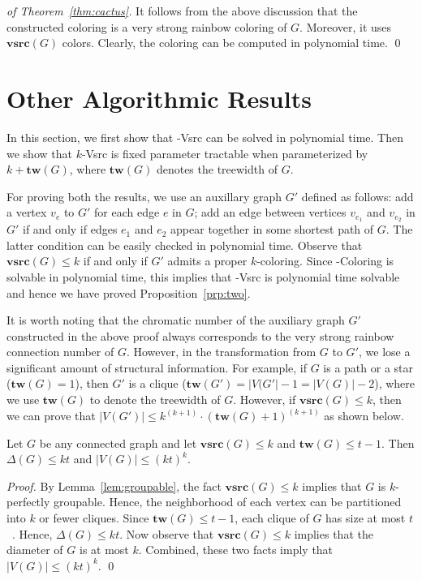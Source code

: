 \documentclass[letter,runningheads,envcountsame,envcountsect]{llncs}
\newcommand{\vsrc}{\mathbf{vsrc}}
\newcommand{\tw}{\mathbf{tw}}
\newcommand{\twovsrc}{{\sc 2-Vsrc}}
\newcommand{\kvsrc}{{\sc $k$-Vsrc}}
\newcommand{\twocolor}{{\sc 2-Coloring}}
\begin{document}
\begin{proof}[of Theorem~\ref{thm:cactus}]
It follows from the above discussion that the constructed coloring is a very strong rainbow coloring of $G$. Moreover, it uses $\vsrc(G)$ colors. Clearly, the coloring can be computed in polynomial time.
\qed\end{proof}


\section{Other Algorithmic Results}
\label{sec:other_results}
In this section, we first show that {\twovsrc} can be solved in polynomial time. Then we show that {\kvsrc} is fixed parameter tractable when parameterized by $k+\tw(G)$, where $\tw(G)$ denotes the treewidth of $G$. 

For proving both the results, we use an auxillary graph $G'$ defined as follows: add a vertex $v_e$ to $G'$ for each edge $e$ in $G$; add an edge between vertices $v_{e_1}$ and $v_{e_2}$ in $G'$ if and only if edges $e_1$ and $e_2$ appear together in some shortest path of $G$. The latter condition can be easily checked in polynomial time. 
Observe that $\vsrc(G) \leq k$ if and only if $G'$ admits a proper $k$-coloring.
Since {\twocolor} is solvable in polynomial time, this implies that {\twovsrc} is polynomial time solvable and hence we have proved Proposition~\ref{prp:two}.

It is worth noting that the chromatic number of the auxiliary graph $G'$ constructed in the above proof always corresponds to the very strong rainbow connection number of $G$. However, in the transformation from $G$ to $G'$, we lose a significant amount of structural information. For example, if $G$ is a path or a star ($\tw(G)=1$), then $G'$ is a clique ($\tw(G') = |V(G'| -1 = |V(G)|-2$), where we use $\tw(G)$ to denote the treewidth of $G$. However, if $\vsrc(G) \leq k$, then we can prove that $|V(G')| \leq k^{(k+1)} \cdot (\tw(G)+1)^{(k+1)}$ as shown below.

\begin{lemma}\label{lem:twbound}
Let $G$ be any connected graph and let $\vsrc(G) \leq k$ and $\tw(G) \leq t-1$. Then $\Delta(G) \leq kt$ and $|V(G)| \leq (kt)^k$.
\end{lemma}
\begin{proof}
By Lemma~\ref{lem:groupable}, the fact $\vsrc(G) \leq k$ implies that $G$ is $k$-perfectly groupable. Hence, the neighborhood of each vertex can be partitioned into $k$ or fewer cliques. Since $\tw(G) \leq t-1$, each clique of $G$ has size at most $t$~\cite{robsey-tw}. Hence, $\Delta(G) \leq kt$. Now observe that $\vsrc(G) \leq k$ implies that the diameter of $G$ is at most $k$. Combined, these two facts imply that $|V(G)| \leq (kt)^k$.
\qed\end{proof}
\end{document}
